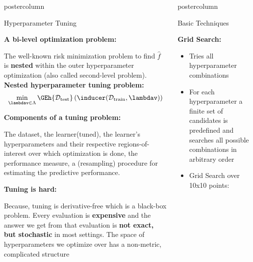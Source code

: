 \documentclass{beamer}
\begin{document}
\begin{frame}[fragile]{}
\begin{columns}
\begin{column}{.31\textwidth}
\begin{beamercolorbox}[center]{postercolumn}
\begin{minipage}{.98\textwidth}
{\begin{myblock}{Hyperparameter Tuning}
\begin{codebox}
\textbf{A bi-level optimization problem:}
\end{codebox}
The well-known risk minimization problem to find $\hat f$ is \textbf{nested} within the outer hyperparameter optimization (also called second-level problem). \textbf{Nested hyperparameter tuning problem:}
$$ \min_{\lambdav \in \Lambda} \GEh{\Dtest}\left(\inducer(\Dtrain, \lambdav)\right) $$
  
  \begin{codebox}
\textbf{Components of a tuning problem:}
\end{codebox}
The dataset, the learner(tuned), the learner’s hyperparameters and their respective regions-of-interest over which optimization is done, the performance measure, a (resampling) procedure for estimating the predictive performance.

\begin{codebox}
\textbf{Tuning is hard:}
\end{codebox}

Because, tuning is derivative-free which is a black-box problem. Every evaluation is \textbf{expensive} and the answer we get from that evaluation is \textbf{not exact, but stochastic} in most settings. The space of hyperparameters we optimize over has a non-metric, complicated structure
\end{myblock}\vfill
						
				}
			\end{minipage}
		\end{beamercolorbox}
	\end{column}

\begin{column}{.31\textwidth}
\begin{beamercolorbox}[center]{postercolumn}
\begin{minipage}{.98\textwidth}
\parbox[t][\columnheight]{\textwidth}{
  
  \begin{myblock}{Basic Techniques}
  
  \begin{codebox}
  \textbf{Grid Search:}
  \end{codebox}
  
  \begin{itemize}[$\bullet$]     
  \setlength{\itemindent}{+.3in}
  \item Tries all hyperparameter combinations
  \item For each hyperparameter a finite set of candidates is predefined and searches all possible combinations in arbitrary order
  \item Grid Search over 10x10 points:
    \end{itemize}
  

\end{myblock}}
\end{minipage}
\end{beamercolorbox}
\end{column}
\end{columns}
\end{frame}
\end{document}
